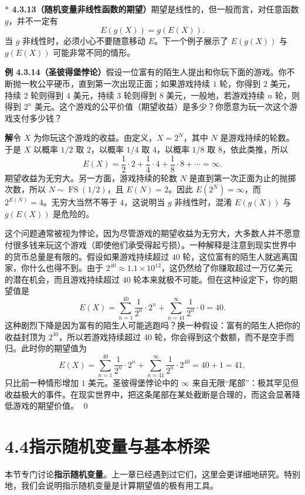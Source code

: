 \documentclass[UTF8,12pt,a4paper,fontset=fandol]{ctexart}
\newcommand{\biohazard}{\ensuremath{\ast}}
\begin{document}
\noindent\textbf{$\biohazard$ 4.3.13（随机变量非线性函数的期望）}\quad 期望是线性的，但一般而言，对任意函数 $g$，并不一定有
\[
  E(g(X))=g(E(X)).
\]
当 $g$ 非线性时，必须小心不要随意移动 $E$。下一个例子展示了 $E(g(X))$ 与 $g(E(X))$ 可能非常不同的情形。

\noindent\textbf{例 4.3.14（圣彼得堡悖论）}\quad 假设一位富有的陌生人提出和你玩下面的游戏。你不断抛一枚公平硬币，直到第一次出现正面；如果游戏持续 $1$ 轮，你得到 $2$ 美元，持续 $2$ 轮则得到 $4$ 美元，持续 $3$ 轮则得到 $8$ 美元，一般地，若游戏持续 $n$ 轮，则得到 $2^n$ 美元。这个游戏的公平价值（期望收益）是多少？你愿意为玩一次这个游戏支付多少钱？

\noindent\textbf{解}\quad 令 $X$ 为你玩这个游戏的收益。由定义，$X=2^N$，其中 $N$ 是游戏持续的轮数。于是 $X$ 以概率 $1/2$ 取 $2$，以概率 $1/4$ 取 $4$，以概率 $1/8$ 取 $8$，依此类推，所以
\[
  E(X)=\frac{1}{2}\cdot 2+\frac{1}{4}\cdot 4+\frac{1}{8}\cdot 8+\cdots=\infty.
\]
期望收益为无穷大。另一方面，游戏持续的轮数 $N$ 是直到第一次正面为止的抛掷次数，所以 $N\sim\operatorname{FS}(1/2)$，且 $E(N)=2$。因此 $E(2^N)=\infty$，而 $2^{E(N)}=4$。无穷大当然不等于 $4$，这说明当 $g$ 非线性时，混淆 $E(g(X))$ 与 $g(E(X))$ 是危险的。

这个问题通常被视为悖论，因为尽管游戏的期望收益为无穷大，大多数人并不愿意付很多钱来玩这个游戏（即使他们承受得起亏损）。一种解释是注意到现实世界中的货币总量是有限的。假设如果游戏持续超过 $40$ 轮，这位富有的陌生人就逃离国家，你什么也得不到。由于 $2^{40}\approx 1.1\times 10^{12}$，这仍然给了你赚取超过一万亿美元的潜在机会，而且游戏持续超过 $40$ 轮本来就极不可能。但在这种设定下，你的期望值是
\[
  E(X)=\sum_{n=1}^{40}\frac{1}{2^n}\cdot 2^n
  +\sum_{n=41}^{\infty}\frac{1}{2^n}\cdot 0
  =40.
\]
这种剧烈下降是因为富有的陌生人可能逃跑吗？换一种假设：富有的陌生人把你的收益封顶为 $2^{40}$，所以若游戏持续超过 $40$ 轮，你会得到这个数额，而不是空手而归。此时你的期望值为
\[
  E(X)=\sum_{n=1}^{40}\frac{1}{2^n}\cdot 2^n
  +\sum_{n=41}^{\infty}\frac{1}{2^n}\cdot 2^{40}
  =40+1=41,
\]
只比前一种情形增加 $1$ 美元。圣彼得堡悖论中的 $\infty$ 来自无限“尾部”：极其罕见但收益极大的事件。在现实世界中，把这条尾部在某处截断是合理的，而这会显著降低游戏的期望价值。 \qed

\section*{4.4\quad 指示随机变量与基本桥梁}

本节专门讨论\textbf{指示随机变量}。上一章已经遇到过它们，这里会更详细地研究。特别地，我们会说明指示随机变量是计算期望值的极有用工具。
\end{document}
